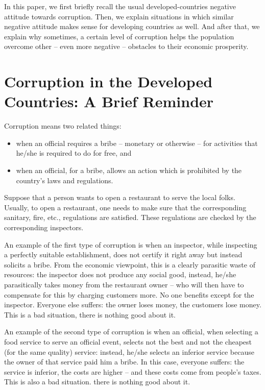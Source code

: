 \documentclass{article}
\begin{document}
 In this paper, we first briefly recall the usual developed-countries negative attitude towards corruption. Then, we explain situations in which similar negative attitude makes sense for developing countries as well. And after that, we explain why sometimes, a certain level of corruption helps the population overcome other -- even more negative -- obstacles to their economic prosperity.

\section{Corruption in the Developed Countries: A Brief Reminder}

 Corruption means two related things:
\begin{itemize}
\item when an official requires a bribe -- monetary or otherwise -- for activities that he/she is required to do for free, and
\item when an official, for a bribe, allows an action which is prohibited by the country's laws and regulations.
\end{itemize}
\medskip

 Suppose that a person wants to open a restaurant to serve the local folks. Usually, to open a restaurant, one needs to make sure that the corresponding sanitary, fire, etc., regulations are satisfied. These regulations are checked by the corresponding inspectors.

An example of the first type of corruption is when an inspector, while inspecting a perfectly suitable establishment, does not certify it right away but instead solicits a bribe. From the economic viewpoint, this is a clearly parasitic waste of resources: the inspector does not produce any social good, instead, he/she parasitically takes money from the restaurant owner -- who will then have to compensate for this by charging customers more. No one benefits except for the inspector. Everyone else suffers: the owner loses money, the customers lose money. This is a bad situation, there is nothing good about it.

An example of the second type of corruption is when an official, when selecting a food service to serve an official event, selects not the best and not the cheapest (for the same quality) service: instead, he/she selects an inferior service because the owner of that service paid him a bribe. In this case, everyone suffers: the service is inferior, the costs are higher -- and these costs come from people's taxes. This is also a bad situation. there is nothing good about it.
\end{document}
